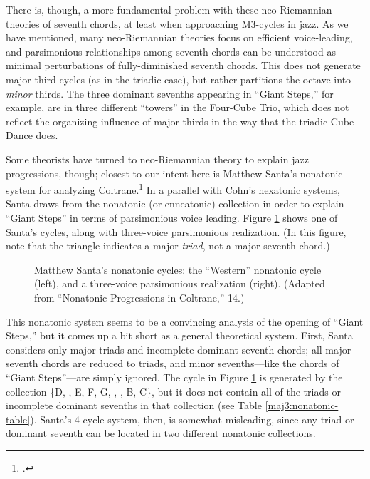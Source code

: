 There is, though, a more fundamental problem with these neo-Riemannian theories
of seventh chords, at least when approaching M3-cycles in jazz. As we have
mentioned, many neo-Riemannian theories focus on
efficient voice-leading, and parsimonious relationships among seventh chords
can be understood as minimal perturbations of fully-diminished seventh
chords. This does not generate major-third cycles (as in the
triadic case), but rather partitions the octave into \emph{minor} thirds. The
three dominant sevenths appearing in ``Giant Steps,'' for example, are in
three different ``towers'' in the Four-Cube Trio, which does not reflect
the organizing influence of major thirds in the way that the triadic Cube
Dance does.

Some theorists have turned to neo-Riemannian theory to explain jazz
progressions, though; closest to our intent here is Matthew Santa's nonatonic
system for analyzing Coltrane.\footcite{santa:2003} In a parallel with Cohn's
hexatonic systems, Santa draws from the nonatonic (or enneatonic) collection
in order to explain ``Giant Steps'' in terms of parsimonious voice leading.
Figure \ref{maj3:nonatonic-cycle} shows one of Santa's cycles, along with
three-voice parsimonious realization. (In this figure, note that the triangle
indicates a major \emph{triad}, not a major seventh chord.)
%
\begin{figure}[tbp]
  \caption[Matthew Santa's nonatonic cycles.]{Matthew Santa's nonatonic
    cycles: the ``Western'' nonatonic cycle (left), and a three-voice parsimonious
    realization (right). (Adapted from ``Nonatonic Progressions in Coltrane,''
    14.)}
\label{maj3:nonatonic-cycle}
\end{figure}
%
This nonatonic system seems to be a convincing analysis of the opening of
``Giant Steps,'' but it comes up a bit short as a general theoretical system.
First, Santa considers only major triads and incomplete dominant seventh
chords; all major seventh chords are reduced to triads, and minor
sevenths---like the \ii chords of ``Giant Steps''---are simply
ignored. The cycle in Figure \ref{maj3:nonatonic-cycle} is
generated by the collection \{D, \Eflat, E, F\sharp, G, \Aflat, \Bflat, B,
C\}, but it does not contain all of the triads or incomplete dominant sevenths
in that collection (see Table \ref{maj3:nonatonic-table}). Santa's 4-cycle
system, then, is somewhat misleading, since any triad or dominant seventh can
be located in two different nonatonic collections.

